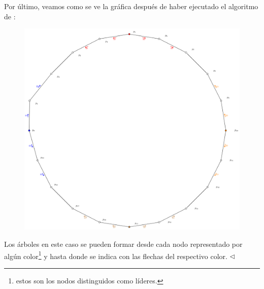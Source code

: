 Por último, veamos como se ve la gráfica después de haber ejecutado el algoritmo de :
\begin{figure}[ht]
        \begin{center}
                \includegraphics[width=15cm]{Ejecucion.png}
        \end{center}
\end{figure}

Los árboles en este caso se pueden formar desde cada nodo representado por algún
color\footnote{estos son los nodos distinguidos como líderes.} y hasta donde se
indica con las flechas del respectivo color.
\hfill $\lhd$
